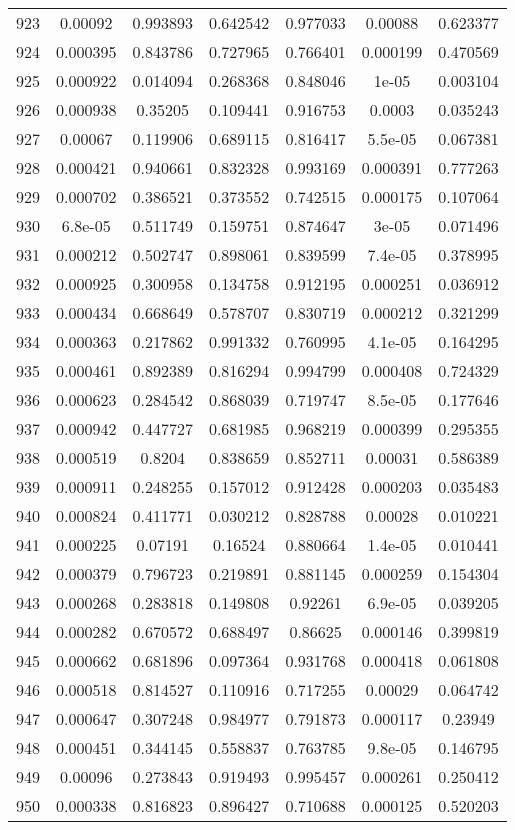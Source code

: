 \begin{table}
\begin{tabular}{c|c|c|c|c|c|c}
923 & 0.00092 & 0.993893 & 0.642542 & 0.977033 & 0.00088 & 0.623377\\
924 & 0.000395 & 0.843786 & 0.727965 & 0.766401 & 0.000199 & 0.470569\\
925 & 0.000922 & 0.014094 & 0.268368 & 0.848046 & 1e-05 & 0.003104\\
926 & 0.000938 & 0.35205 & 0.109441 & 0.916753 & 0.0003 & 0.035243\\
927 & 0.00067 & 0.119906 & 0.689115 & 0.816417 & 5.5e-05 & 0.067381\\
928 & 0.000421 & 0.940661 & 0.832328 & 0.993169 & 0.000391 & 0.777263\\
929 & 0.000702 & 0.386521 & 0.373552 & 0.742515 & 0.000175 & 0.107064\\
930 & 6.8e-05 & 0.511749 & 0.159751 & 0.874647 & 3e-05 & 0.071496\\
931 & 0.000212 & 0.502747 & 0.898061 & 0.839599 & 7.4e-05 & 0.378995\\
932 & 0.000925 & 0.300958 & 0.134758 & 0.912195 & 0.000251 & 0.036912\\
933 & 0.000434 & 0.668649 & 0.578707 & 0.830719 & 0.000212 & 0.321299\\
934 & 0.000363 & 0.217862 & 0.991332 & 0.760995 & 4.1e-05 & 0.164295\\
935 & 0.000461 & 0.892389 & 0.816294 & 0.994799 & 0.000408 & 0.724329\\
936 & 0.000623 & 0.284542 & 0.868039 & 0.719747 & 8.5e-05 & 0.177646\\
937 & 0.000942 & 0.447727 & 0.681985 & 0.968219 & 0.000399 & 0.295355\\
938 & 0.000519 & 0.8204 & 0.838659 & 0.852711 & 0.00031 & 0.586389\\
939 & 0.000911 & 0.248255 & 0.157012 & 0.912428 & 0.000203 & 0.035483\\
940 & 0.000824 & 0.411771 & 0.030212 & 0.828788 & 0.00028 & 0.010221\\
941 & 0.000225 & 0.07191 & 0.16524 & 0.880664 & 1.4e-05 & 0.010441\\
942 & 0.000379 & 0.796723 & 0.219891 & 0.881145 & 0.000259 & 0.154304\\
943 & 0.000268 & 0.283818 & 0.149808 & 0.92261 & 6.9e-05 & 0.039205\\
944 & 0.000282 & 0.670572 & 0.688497 & 0.86625 & 0.000146 & 0.399819\\
945 & 0.000662 & 0.681896 & 0.097364 & 0.931768 & 0.000418 & 0.061808\\
946 & 0.000518 & 0.814527 & 0.110916 & 0.717255 & 0.00029 & 0.064742\\
947 & 0.000647 & 0.307248 & 0.984977 & 0.791873 & 0.000117 & 0.23949\\
948 & 0.000451 & 0.344145 & 0.558837 & 0.763785 & 9.8e-05 & 0.146795\\
949 & 0.00096 & 0.273843 & 0.919493 & 0.995457 & 0.000261 & 0.250412\\
950 & 0.000338 & 0.816823 & 0.896427 & 0.710688 & 0.000125 & 0.520203\\
\end{tabular}
\end{table}
